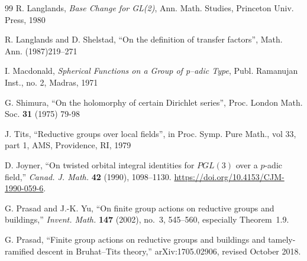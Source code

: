 \documentclass[12pt,letterpaper]{amsart}
\numberwithin{equation}{section}
\theoremstyle{definition}
\theoremstyle{plain}
\begin{document}
\begin{thebibliography}{99}
 R. Langlands, \emph{Base Change for GL(2)}, 
Ann. Math. Studies, Princeton Univ. Press, 1980 

 R. Langlands and D. Shelstad, ``On the definition of transfer 
factors'', Math. Ann. (1987)219--271

 I. Macdonald, \emph{Spherical Functions on a Group of
p--adic Type}, Publ. Ramanujan Inst., no. 2, Madras, 1971

 G. Shimura, ``On the holomorphy of certain Dirichlet series'',
Proc. London Math. Soc. \textbf{31} (1975) 79-98

 J. Tits, ``Reductive groups over local fields'', in Proc. 
Symp. Pure Math., vol 33, part 1, AMS, Providence, RI, 1979





D. Joyner, ``On twisted orbital integral identities for $PGL(3)$ over a
$p$-adic field,'' \emph{Canad. J. Math.} \textbf{42} (1990), 1098--1130.
\url{https://doi.org/10.4153/CJM-1990-059-6}.

G. Prasad and J.-K. Yu, ``On finite group actions on reductive
groups and buildings,'' \emph{Invent. Math.} \textbf{147}
(2002), no.~3, 545--560, especially Theorem~1.9.

G. Prasad, ``Finite group actions on reductive groups and buildings
and tamely-ramified descent in Bruhat--Tits theory,''
arXiv:1705.02906, revised October 2018.

\end{thebibliography}
\end{document}
